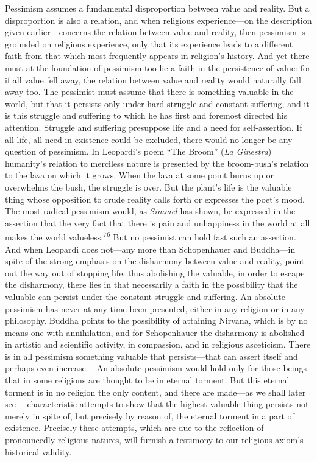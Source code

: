 \documentclass[12pt,a4paper]{book}
\newcommand{\opage}[1]{\marginnote{\footnotesize\textit{[#1]}}}
\begin{document}
Pessimism assumes a fundamental disproportion between value and reality. But a disproportion is also a
relation, and when religious experience---on the description given earlier---concerns the relation between
value and reality, then pessimism is grounded on religious experience, only that its experience leads to a
different faith from that which most frequently appears in religion's history. And yet there must at the
foundation of pessimism too lie a faith in the persistence of value: for if all value fell away, the relation
between value and reality would naturally fall away too. The pessimist must assume that there is something
valuable in the world, but that it persists only under hard struggle and constant suffering, and it is this
struggle and suffering to which he has first and foremost directed his attention. Struggle and suffering
presuppose life and a need for self-assertion. If all life, all need in existence could be excluded, there
would no longer be any question of pessimism. In Leopardi's poem ``The Broom'' (\emph{La Ginestra}) humanity's
relation to merciless nature is presented by the broom-bush's relation to the lava on which it grows. When
the lava at some point burns up or overwhelms the bush, the struggle is over. But the plant's life is the
valuable thing whose opposition to crude reality calls forth or expresses the poet's mood. The most radical
pessimism would, as \emph{Simmel} has shown, 
\opage{153}be expressed in the assertion that the very fact that there is
pain and unhappiness in the world at all makes the world valueless.\textsuperscript{76} But no pessimist can
hold fast such an assertion. And when Leopardi does not---any more than Schopenhauer and Buddha---in spite of
the strong emphasis on the disharmony between value and reality, point out the way out of stopping life, thus
abolishing the valuable, in order to escape the disharmony, there lies in that necessarily a faith in the
possibility that the valuable can persist under the constant struggle and suffering. An absolute pessimism has
never at any time been presented, either in any religion or in any philosophy. Buddha points to the possibility
of attaining Nirvana, which is by no means one with annihilation, and for Schopenhauer the disharmony is
abolished in artistic and scientific activity, in compassion, and in religious asceticism. There is in all
pessimism something valuable that persists---that can assert itself and perhaps even increase.---An absolute
pessimism would hold only for those beings that in some religions are thought to be in eternal torment. But
this eternal torment is in no religion the only content, and there are made---as we shall later see---
characteristic attempts to show that the highest valuable thing persists not merely in spite of, but precisely
by reason of, the eternal torment in a part of existence. Precisely these attempts, which are due to the
reflection of pronouncedly religious natures, will furnish a testimony to our religious axiom's historical
validity.
\end{document}
